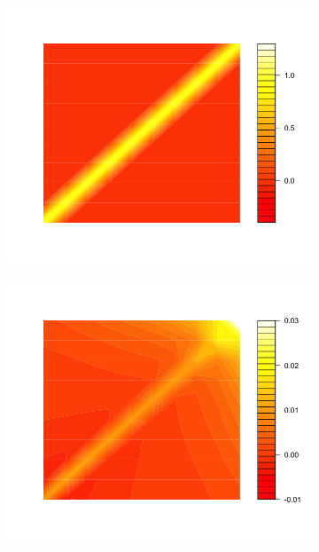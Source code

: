 \begin{figure}[H]
  \begin{subfigure}[t]{0.19\textwidth}
\centering
\includegraphics[width = \textwidth]{../img/chapter-4/true-covariance-1-heat-map}
\end{subfigure}
\hfill
  \begin{subfigure}[t]{0.19\textwidth}
\centering
\includegraphics[width = \textwidth]{../img/chapter-4/true-covariance-2-heat-map}

\end{subfigure}
\end{figure}
